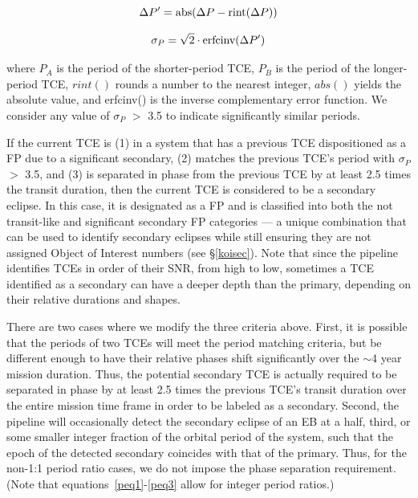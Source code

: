 \begin{equation}
\label{peq2}
\Delta P^{\prime} = \textrm{abs}(\Delta P - \textrm{rint}(\Delta P))\\
\end{equation}

\begin{equation}
\label{peq3}
\sigma_{P} = \sqrt{2}\cdot\textrm{erfcinv}(\Delta P^{\prime})\\
\end{equation}

\noindent where $P_{A}$ is the period of the shorter-period TCE, $P_{B}$ is the period of the longer-period TCE, $rint()$ rounds a number to the nearest integer, $abs()$ yields the absolute value, and erfcinv() is the inverse complementary error function. We consider any value of $\sigma_{P}$ $>$ 3.5 to indicate significantly similar periods.

If the current TCE is (1) in a system that has a previous TCE dispositioned as a FP due to a significant secondary, (2) matches the previous TCE's period with $\sigma_{P}$ $>$ 3.5, and (3) is separated in phase from the previous TCE by at least 2.5 times the transit duration, then the current TCE is considered to be a secondary eclipse. In this case, it is designated as a FP and is classified into both the not transit-like and significant secondary FP categories --- a unique combination that can be used to identify secondary eclipses while still ensuring they are not assigned \kepler{} Object of Interest numbers (see \S\ref{koisec}). Note that since the \kepler{} pipeline identifies TCEs in order of their SNR, from high to low, sometimes a TCE identified as a secondary can have a deeper depth than the primary, depending on their relative durations and shapes.

There are two cases where we modify the three criteria above. First, it is possible that the periods of two TCEs will meet the period matching criteria, but be different enough to have their relative phases shift significantly over the $\sim$4 year mission duration. Thus, the potential secondary TCE is actually required to be separated in phase by at least 2.5 times the previous TCE's transit duration over the entire mission time frame in order to be labeled as a secondary. Second, the \kepler{} pipeline will occasionally detect the secondary eclipse of an EB at a half, third, or some smaller integer fraction of the orbital period of the system, such that the epoch of the detected secondary coincides with that of the primary. Thus, for the non-1:1 period ratio cases, we do not impose the phase separation requirement. (Note that equations~\ref{peq1}-\ref{peq3} allow for integer period ratios.)



